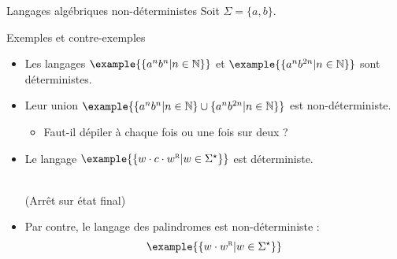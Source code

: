 
\begingroup

\begin{frame}{Langages algébriques non-déterministes}
  Soit $\Sigma = \{a, b\}$.
  
  \begin{exampleblock}{Exemples et contre-exemples}
    \begin{itemize}
    \item Les langages $\example{\{ a^n b^n | n\in \mathbb{N}\}}$ et $\example{\{ a^n b^{2n} | n\in \mathbb{N}\}}$ sont déterministes.
    \item Leur union $\example{\{ a^n b^n | n\in \mathbb{N}\} \cup \{ a^n b^{2n} | n\in \mathbb{N}\}}$ est non-déterministe.
      \begin{itemize}
      \item Faut-il dépiler à chaque fois ou une fois sur deux ? 
      \end{itemize}
    \item Le langage $\example{\{ w \cdot c \cdot w^{\textsc{r}} | w\in \Sigma^\star\}}$ est déterministe.
      \begin{center}
        \\
        (Arrêt sur état final)
      \end{center}
    \item Par contre, le langage des palindromes est non-déterministe :
      $$\example{\{ w \cdot w^{\textsc{r}} | w\in \Sigma^\star\}}$$
    \end{itemize}
  \end{exampleblock}
\end{frame}

\endgroup
